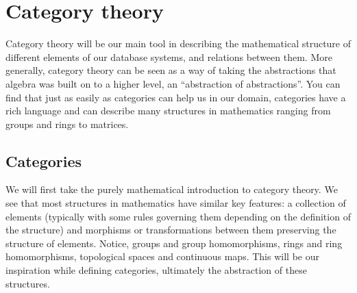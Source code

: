 \section{Category theory}
Category theory will be our main tool in describing the mathematical structure of different elements of our database systems, and relations between them. More generally, category theory can be seen as a way of taking the abstractions that algebra was built on to a higher level, an ``abstraction of abstractions''. You can find that just as easily as categories can help us in our domain, categories have a rich language and can describe many structures in mathematics ranging from groups and rings to matrices. 
\subsection{Categories}
\theoremstyle{definition}\newtheorem*{categorydef}{Category}
We will first take the purely mathematical introduction to category theory. We see that most structures in mathematics have similar key features: a collection of elements (typically with some rules governing them depending on the definition of the structure) and morphisms or transformations between them preserving the structure of elements. Notice, groups and group homomorphisms, rings and ring homomorphisms, topological spaces and continuous maps. This will be our inspiration while defining categories, ultimately the abstraction of these structures. 
